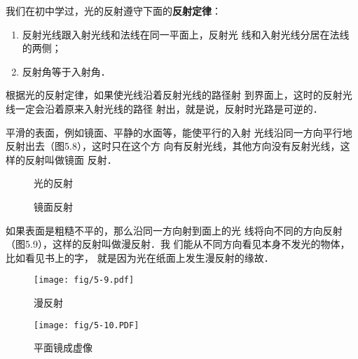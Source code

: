 我们在初中学过，光的反射遵守下面的\textbf{反射定律}：

\begin{enumerate}
    \item 反射光线跟入射光线和法线在同一平面上，反射光
线和入射光线分居在法线的两侧；
\item 反射角等于入射角．
\end{enumerate}

根据光的反射定律，如果使光线沿着反射光线的路径射
到界面上，这时的反射光线一定会沿着原来入射光线的路径
射出，就是说，反射时光路是可逆的．

平滑的表面，例如镜面、平静的水面等，能使平行的入射
光线沿同一方向平行地反射出去（图5.8），这时只在这个方
向有反射光线，其他方向没有反射光线，这样的反射叫做镜面
反射．
\begin{figure}[htp]
    \centering
    \begin{minipage}[t]{0.48\textwidth}
    \centering
    \caption{光的反射}
    \end{minipage}
    \begin{minipage}[t]{0.48\textwidth}
    \centering
    \caption{镜面反射}
    \end{minipage}
    \end{figure}

如果表面是粗糙不平的，那么沿同一方向射到面上的光
线将向不同的方向反射（图5.9），这样的反射叫做漫反射．我
们能从不同方向看见本身不发光的物体，比如看见书上的字，
就是因为光在纸面上发生漫反射的缘故．
\begin{figure}[htp]
    \centering
    \begin{minipage}[t]{0.48\textwidth}
    \centering
    \texttt{[image: fig/5-9.pdf]}
    \caption{漫反射}
    \end{minipage}
    \begin{minipage}[t]{0.48\textwidth}
    \centering
    \texttt{[image: fig/5-10.PDF]}
    \caption{平面镜成虚像}
    \end{minipage}
    \end{figure}

